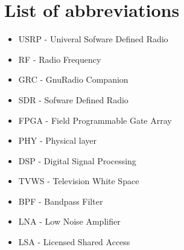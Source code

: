 \section*{List of abbreviations}



\begin{itemize}
\tightlist
\item
  USRP - Univeral Sofware Defined Radio
\item
  RF - Radio Frequency
\item
  GRC - GnuRadio Companion
\item
  SDR - Sofware Defined Radio
\item
  FPGA - Field Programmable Gate Array
\item
  PHY - Physical layer
\item
  DSP - Digital Signal Processing
\item
  TVWS - Television White Space
\item
  BPF - Bandpass Filter
\item
  LNA - Low Noise Amplifier
\item
  LSA - Licensed Shared Access
\end{itemize}
